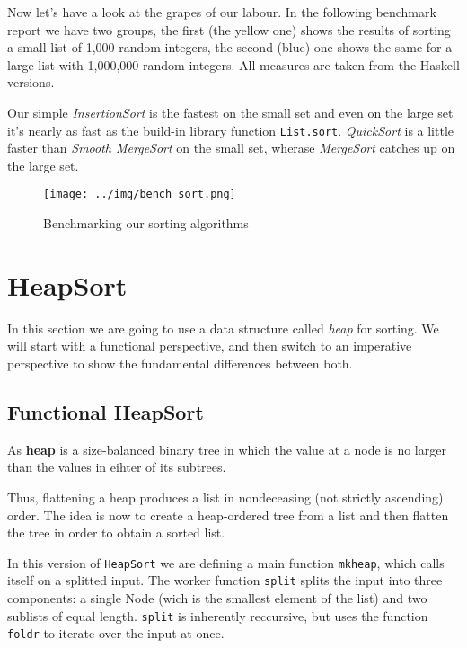 Now let's have a look at the grapes of our labour.
In the following benchmark report we have two groups, the first (the yellow one) shows the results of sorting a small list of 1,000 random integers, the second (blue) one shows the same for a large list with 1,000,000 random integers. All measures are taken from the Haskell versions.

Our simple \emph{InsertionSort} is the fastest on the small set and even on the large set it's nearly as fast as the build-in library function \texttt{List.sort}.
\emph{QuickSort} is a little faster than \emph{Smooth MergeSort} on the small set, wherase \emph{MergeSort} catches up on the large set.

\begin{figure}[ht]
\centering
\texttt{[image: ../img/bench\_sort.png]}
\caption[Sorting benchmarks]{Benchmarking our sorting algorithms}
\end{figure}

\section{HeapSort}

In this section we are going to use a data structure called \emph{heap} for sorting. We will start with a functional perspective, and then switch to an imperative perspective to show the fundamental differences between both.

\subsection{Functional HeapSort}

\begin{defn}[Heap]
As \textbf{heap} is a size-balanced binary tree in which the value at a node is no larger than the values in eihter of its subtrees.
\end{defn}

Thus, flattening a heap produces a list in nondeceasing (not strictly ascending) order.
The idea is now to create a heap-ordered tree from a list and then flatten the tree in order to obtain a sorted list.

\begin{impl}
In this version of \texttt{HeapSort} we are defining a main function \texttt{mkheap}, which calls itself on a splitted input.
The worker function \texttt{split} splits the input into three components: a single Node (wich is the smallest element of the list) and two sublists of equal length.
\texttt{split} is inherently reccursive, but uses the function \texttt{foldr} to iterate over the input at once.
\end{impl}

